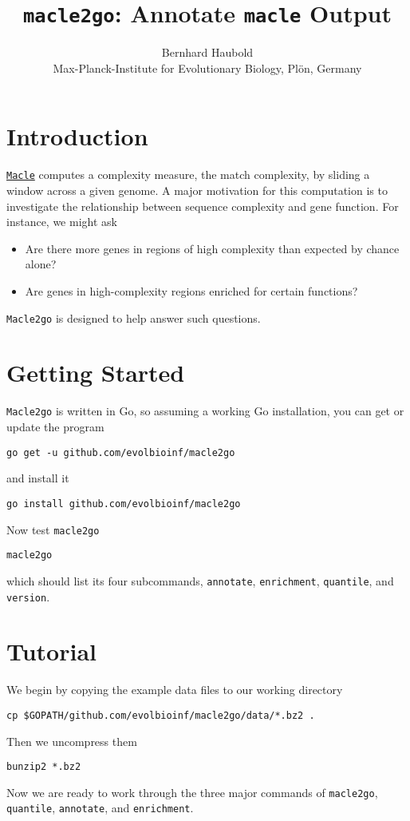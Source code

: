 \documentclass[a4paper]{article}
\newcommand{\ty}{\texttt}
\begin{document}
\title{\ty{macle2go}: Annotate \ty{macle} Output}
\author{Bernhard Haubold\\\small Max-Planck-Institute for Evolutionary Biology, Pl\"on, Germany}
\maketitle
\section{Introduction}
\href{http://github.com/evolbioinf/macle}{\ty{Macle}} computes a
complexity measure, the match complexity, by sliding a window across
a given genome. A major motivation for this computation is to
investigate the relationship between sequence complexity and gene
function. For instance, we might ask
\begin{itemize}
\item Are there more genes in regions
  of high complexity than expected by chance alone?
\item Are genes in high-complexity regions enriched for certain
  functions?
\end{itemize}
\ty{Macle2go} is designed to help answer such questions.
\section{Getting Started}
\ty{Macle2go} is written in Go, so assuming a working Go
installation, you can get or update the program
\begin{verbatim}
go get -u github.com/evolbioinf/macle2go
\end{verbatim}
and install it
\begin{verbatim}
go install github.com/evolbioinf/macle2go
\end{verbatim}
Now test \ty{macle2go}
\begin{verbatim}
macle2go
\end{verbatim}
which should list its four subcommands, \ty{annotate},
\ty{enrichment}, \ty{quantile}, and \ty{version}.

\section{Tutorial}
We begin by copying the example data files to our
working directory
\begin{verbatim}
cp $GOPATH/github.com/evolbioinf/macle2go/data/*.bz2 .
\end{verbatim}
Then we uncompress them
\begin{verbatim}
bunzip2 *.bz2
\end{verbatim}
Now we are ready to work through the three major commands of
\ty{macle2go}, \ty{quantile}, \ty{annotate}, and \ty{enrichment}.
\end{document}
